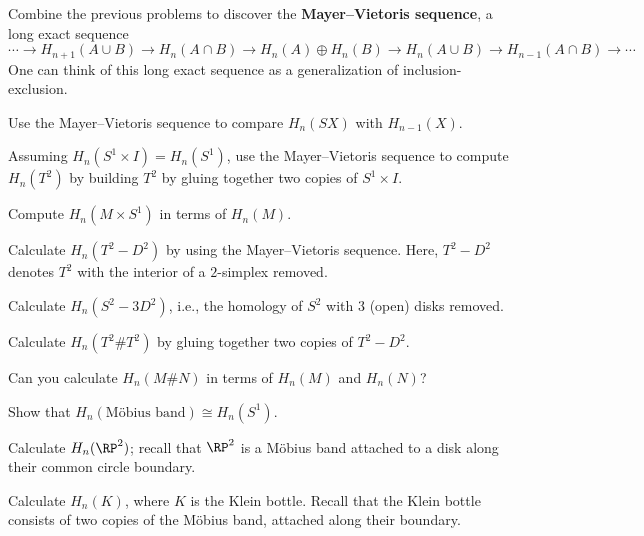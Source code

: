 \documentclass[12pt]{pset}
\begin{document}
\begin{problem}
  Combine the previous problems to discover the \textbf{Mayer--Vietoris
    sequence}, a long exact sequence
$$
\cdots \to H_{n+1}(A \cup B) \to H_n(A \cap B) \to H_n(A) \oplus H_n(B) \to H_n(A
\cup B) \to H_{n-1}(A \cap B) \to \cdots
$$
One can think of this long exact sequence as a generalization of
inclusion-exclusion.
\end{problem}

\begin{requiredproblem}
  Use the Mayer--Vietoris sequence to compare $H_n(SX)$ with $H_{n-1}(X)$.
\end{requiredproblem}

\begin{problem}
  Assuming $H_n(S^1 \times I) = H_n(S^1)$, use the Mayer--Vietoris
  sequence to compute $H_n(T^2)$ by building $T^2$ by gluing together
  two copies of $S^1 \times I$.
\end{problem}

\begin{problem}
  Compute $H_n(M \times S^1)$ in terms of $H_n(M)$.
\end{problem}

\begin{requiredproblem}
  Calculate $H_n(T^2 - D^2)$ by using the Mayer--Vietoris sequence.
  Here, $T^2 - D^2$ denotes $T^2$ with the interior of a $2$-simplex
  removed.
\end{requiredproblem}

\begin{problem}
 Calculate $H_n(S^2 - 3D^2)$, i.e., the homology of $S^2$ with 3 (open) disks removed.
\end{problem}

\begin{requiredproblem}
Calculate $H_n(T^2 \# T^2)$ by gluing together two copies of $T^2 - D^2$.
\end{requiredproblem}

\begin{problem}
  Can you calculate $H_n(M \# N)$ in terms of $H_n(M)$ and $H_n(N)$?
\end{problem}

\begin{problem}
  Show that $H_n(\mbox{M\"obius band}) \cong H_n(S^1)$.
\end{problem}

\begin{requiredproblem}
Calculate $H_n(\RP^2)$; recall that $\RP^2$ is a M\"obius band attached to a disk along their common circle boundary.
\end{requiredproblem}

\begin{problem}
  Calculate $H_n(K)$, where $K$ is the Klein bottle.  Recall that the
  Klein bottle consists of two copies of the M\"obius band, attached
  along their boundary.
\end{problem}
\end{document}
